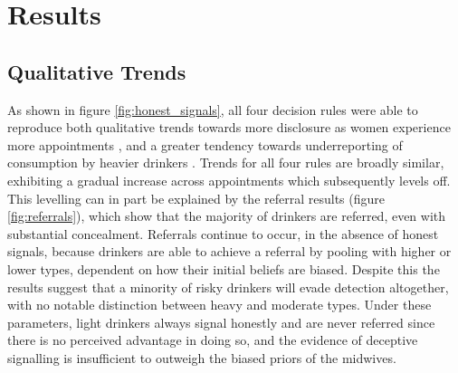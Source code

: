 \section{Results}
\label{sec:results}


\subsection{Qualitative Trends}
\label{sub:qt_results}

As shown in figure \ref{fig:honest_signals}, all four decision rules were able to reproduce both qualitative trends towards more disclosure as women experience more appointments \citep{Phillips2007}, and a greater tendency towards underreporting of consumption by heavier drinkers \citep{Alvik2006}.  Trends for all four rules are broadly similar, exhibiting a gradual increase across appointments which subsequently levels off. This levelling can in part be explained by the referral results (figure \ref{fig:referrals}), which show that the majority of drinkers are referred, even with substantial concealment. Referrals continue to occur, in the absence of honest signals, because drinkers are able to achieve a referral by pooling with higher or lower types, dependent on how their initial beliefs are biased. Despite this the results suggest that a minority of risky drinkers will evade detection altogether, with no notable distinction between heavy and moderate types. Under these parameters, light drinkers always signal honestly and are never referred since there is no perceived advantage in doing so, and the evidence of deceptive signalling is insufficient to outweigh the biased priors of the midwives. 

